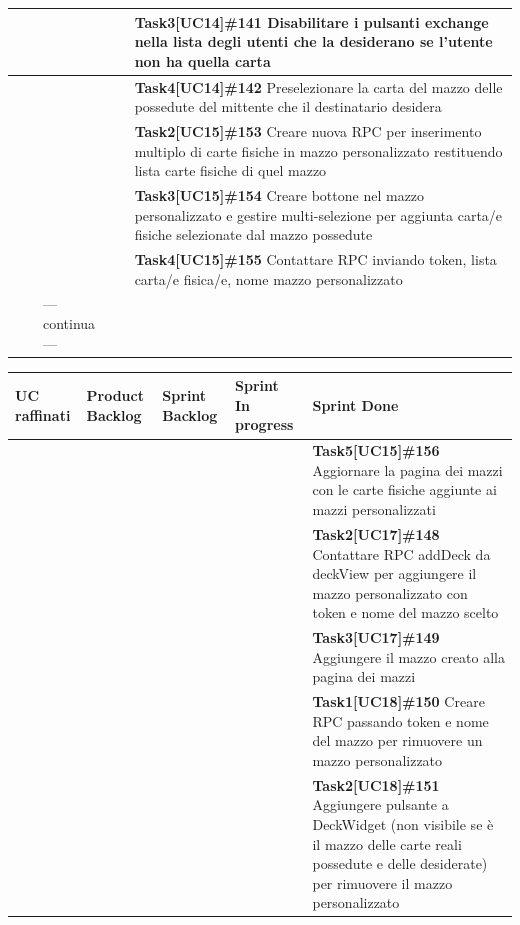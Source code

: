 \documentclass[a4paper, oneside]{article}
\begin{document}
\begin{landscape}
\begin{tabular}{ | p{7cm} | p{3cm} | p{2.8cm} | p{3cm} | p{7.2cm}| }
            & &  & & \textbf{Task3[UC14]\#141} Disabilitare i pulsanti exchange nella lista degli utenti che la desiderano se l'utente non ha quella carta   \\ \hline
            & &  & & \textbf{Task4[UC14]\#142} Preselezionare la carta del mazzo delle possedute del mittente che il destinatario desidera   \\ \hline
            & &  & & \textbf{Task2[UC15]\#153} Creare nuova RPC per inserimento multiplo di carte fisiche in mazzo personalizzato restituendo lista carte fisiche di quel mazzo   \\ \hline
            & &  & & \textbf{Task3[UC15]\#154} Creare bottone nel mazzo personalizzato e gestire multi-selezione per aggiunta carta/e fisiche selezionate dal mazzo possedute   \\ \hline
            & &  & & \textbf{Task4[UC15]\#155} Contattare RPC inviando token, lista carta/e fisica/e, nome mazzo personalizzato   \\ \hline
            & & --- continua --- & & \\
            \hline
        \end{tabular}
        \newpage
        \small
        \noindent
        \def\arraystretch{2}%
        \begin{tabular}{ | p{7cm} | p{3cm} | p{2.8cm} | p{3cm} | p{7.2cm}| }
            \hline
            \textbf{UC raffinati}
            & \textbf{Product Backlog}
            & \textbf{Sprint Backlog}
            & \textbf{Sprint In progress}
            & \textbf{Sprint Done} \\
            \hline
            \hline
            & &  & & \textbf{Task5[UC15]\#156} Aggiornare la pagina dei mazzi con le carte fisiche aggiunte ai mazzi personalizzati   \\ \hline
            & &  & & \textbf{Task2[UC17]\#148} Contattare RPC addDeck da deckView per aggiungere il mazzo personalizzato con token e nome del mazzo scelto   \\ \hline
            & &  & & \textbf{Task3[UC17]\#149} Aggiungere il mazzo creato alla pagina dei mazzi   \\ \hline
            & &  & & \textbf{Task1[UC18]\#150} Creare RPC passando token e nome del mazzo per rimuovere un mazzo personalizzato   \\ \hline
            & &  & & \textbf{Task2[UC18]\#151} Aggiungere pulsante a DeckWidget (non visibile se è il mazzo delle carte reali possedute e delle desiderate) per rimuovere il mazzo personalizzato   \\ \hline

\end{tabular}
\end{landscape}
\end{document}
